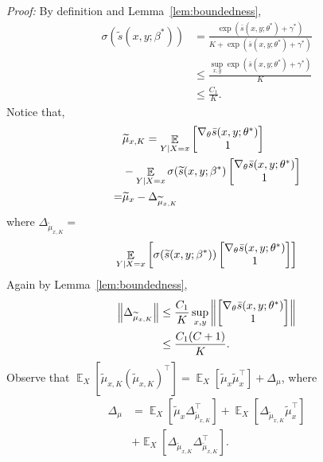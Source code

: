 \documentclass[11pt,a4paper]{article}
\DeclareMathOperator{\E}{\mathbb{E}}
\newcommand{\wt}[1]{\widetilde{#1}}
\newcommand{\gtheta}{\ensuremath \nabla_{\theta}}
\newcommand{\ssf}[3]{\bar{s}(#1, #2; #3)}
\newcommand{\sbc}[3]{\wt{s}(#1, #2; #3)}
\newcommand{\mubxk}{\wt{\mu}_{x, K}}
\newcommand{\mubx}{\wt{\mu}_{x}}
\newcommand{\vnorm}[1]{\left\| #1 \right\|}
\begin{document}
{\em Proof: }By definition and Lemma~\ref{lem:boundedness},
\begin{equation*}
\begin{aligned}
\sigma(\sbc{x}{y}{\beta^*}) & = \frac{\exp(\ssf{x}{y}{\theta^*} + \gamma^*)}{K + \exp(\ssf{x}{y}{\theta^*} + \gamma^*)}  \\
& \leq \frac{\sup_{x,y}\exp(\ssf{x}{y}{\theta^*} + \gamma^*)}{K} \\
& \leq \frac{C_1}{K}. 
\end{aligned}
\end{equation*}
Notice that, 
  \begin{equation*}
  \begin{aligned}
     & \mubxk =  \E_{Y|X = x} \begin{bmatrix} \gtheta \ssf{x}{y}{\theta^*} \\ 1\end{bmatrix}  \\
     &  - \E_{Y|X = x} \sigma(\sbc{x}{y}{\beta^*}\begin{bmatrix} \gtheta \ssf{x}{y}{\theta^*} \\ 1\end{bmatrix}  \\
   = & \mubx  - \Delta_{\mubxk} 
  \end{aligned}
  \end{equation*}
  where $\Delta_{\mubxk} = $
\begin{equation*}
\begin{aligned}
  \E_{Y|X = x} \left[\sigma(\sbc{x}{y}{\beta^*})\begin{bmatrix} \gtheta \ssf{x}{y}{\theta^*} \\ 1\end{bmatrix}\right]
\end{aligned}
\end{equation*}
Again by Lemma~\ref{lem:boundedness},
\begin{equation*}
\begin{aligned}
  \vnorm{\Delta_{\mubxk}} & \leq \frac{C_1}{K} \sup_{x,y}\vnorm{\begin{bmatrix} \gtheta \ssf{x}{y}{\theta^*} \\ 1\end{bmatrix}} \\
  &  \leq \frac{C_1 (C+1)}{K}.  
\end{aligned}
\end{equation*}
Observe that $\E_X \left[\mubxk (\mubxk)^\top\right] = \E_X \left[\mubx\mubx^\top\right] + \Delta_{\mu}$, where 
\begin{equation*}
\begin{aligned}
 \Delta_{\mu}  &=  \E_X \left[\mubx\Delta_{\mubxk}^\top \right]  + \E_X \left[\Delta_{\mubxk}\mubx^\top  \right] \\
 & + \E_X \left[\Delta_{\mubxk}\Delta_{\mubxk}^\top\right]. 
\end{aligned}
\end{equation*}
\end{document}
